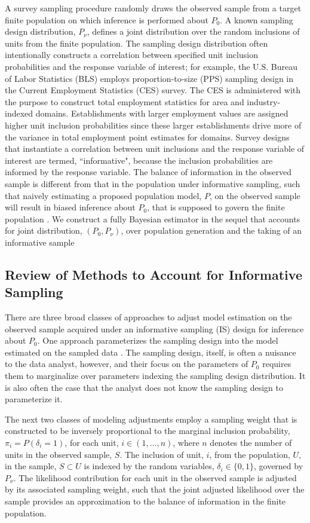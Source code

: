 \documentclass[]{imsart}
\begin{document}
A survey sampling procedure randomly draws the observed sample from a target finite population on which inference is performed about $P_{0}$.  A known sampling design distribution, $P_{\nu}$, defines a joint distribution over the random inclusions of units from the finite population.   The sampling design distribution often intentionally constructs a correlation between specified unit inclusion probabilities and the response variable of interest; for example, the U.S. Bureau of Labor Statistics (BLS) employs proportion-to-size (PPS) sampling design in the Current Employment Statistics (CES) survey.  The CES is administered with the purpose to construct total employment statistics for area and industry-indexed domains.  Establishments with larger employment values are assigned higher unit inclusion probabilities since these larger establishments drive more of the variance in total employment point estimates for domains.  Survey designs that instantiate a correlation between unit inclusions and the response variable of interest are termed, ``informative", because the inclusion probabilities are informed by the response variable.  The balance of information in the observed sample is different from that in the population under informative sampling, such that naively estimating a proposed population model, $P$, on the observed sample will result in biased inference about $P_{0}$, that is supposed to govern the finite population \citep{savitsky2016bayesian}.  We construct a fully Bayesian estimator in the sequel that accounts for joint distribution, $(P_{0},P_{\nu})$, over population generation and the taking of an informative sample

\subsection{Review of  Methods to Account for Informative Sampling}
There are three broad classes of approaches to adjust model estimation on the observed sample acquired under an informative sampling (IS) design for inference about $P_{0}$. One approach parameterizes the sampling design into the model estimated on the sampled data \citep{Litt:mode:2004}.  The sampling design, itself, is often a nuisance to the data analyst, however, and their focus on the parameters of $P_{0}$ requires them to marginalize over parameters indexing the sampling design distribution.  It is also often the case that the analyst does not know the sampling design to parameterize it.

The next two classes of modeling adjustments employ a sampling weight that is constructed to be inversely proportional to the marginal inclusion probability, $\pi_{i} = P\left(\delta_{i} = 1\right)$, for each unit, $i \in \left(1,\ldots,n\right)$, where $n$ denotes the number of units in the observed sample, $S$.  The inclusion of unit, $i$, from the population, $U$, in the sample, $S \subset U$ is indexed by the random variables, $\delta_{i} \in \{0,1\}$, governed by $P_{\nu}$.  The likelihood contribution for each unit in the observed sample is adjusted by its associated sampling weight, such that the joint adjusted likelihood over the sample provides an approximation to the balance of information in the finite population.
\end{document}
